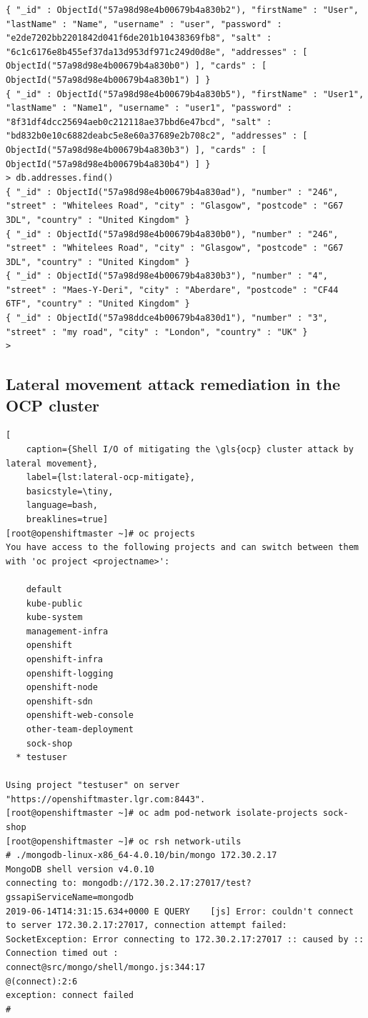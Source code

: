 \begin{lstlisting}
{ "_id" : ObjectId("57a98d98e4b00679b4a830b2"), "firstName" : "User", "lastName" : "Name", "username" : "user", "password" : "e2de7202bb2201842d041f6de201b10438369fb8", "salt" : "6c1c6176e8b455ef37da13d953df971c249d0d8e", "addresses" : [ ObjectId("57a98d98e4b00679b4a830b0") ], "cards" : [ ObjectId("57a98d98e4b00679b4a830b1") ] }
{ "_id" : ObjectId("57a98d98e4b00679b4a830b5"), "firstName" : "User1", "lastName" : "Name1", "username" : "user1", "password" : "8f31df4dcc25694aeb0c212118ae37bbd6e47bcd", "salt" : "bd832b0e10c6882deabc5e8e60a37689e2b708c2", "addresses" : [ ObjectId("57a98d98e4b00679b4a830b3") ], "cards" : [ ObjectId("57a98d98e4b00679b4a830b4") ] }
> db.addresses.find()
{ "_id" : ObjectId("57a98d98e4b00679b4a830ad"), "number" : "246", "street" : "Whitelees Road", "city" : "Glasgow", "postcode" : "G67 3DL", "country" : "United Kingdom" }
{ "_id" : ObjectId("57a98d98e4b00679b4a830b0"), "number" : "246", "street" : "Whitelees Road", "city" : "Glasgow", "postcode" : "G67 3DL", "country" : "United Kingdom" }
{ "_id" : ObjectId("57a98d98e4b00679b4a830b3"), "number" : "4", "street" : "Maes-Y-Deri", "city" : "Aberdare", "postcode" : "CF44 6TF", "country" : "United Kingdom" }
{ "_id" : ObjectId("57a98ddce4b00679b4a830d1"), "number" : "3", "street" : "my road", "city" : "London", "country" : "UK" }
>
\end{lstlisting}

\subsection{Lateral movement attack remediation in the OCP cluster}
\begin{lstlisting}[
	caption={Shell I/O of mitigating the \gls{ocp} cluster attack by lateral movement},
	label={lst:lateral-ocp-mitigate},
	basicstyle=\tiny,
	language=bash,
	breaklines=true]
[root@openshiftmaster ~]# oc projects
You have access to the following projects and can switch between them with 'oc project <projectname>':

    default
    kube-public
    kube-system
    management-infra
    openshift
    openshift-infra
    openshift-logging
    openshift-node
    openshift-sdn
    openshift-web-console
    other-team-deployment
    sock-shop
  * testuser

Using project "testuser" on server "https://openshiftmaster.lgr.com:8443".
[root@openshiftmaster ~]# oc adm pod-network isolate-projects sock-shop
[root@openshiftmaster ~]# oc rsh network-utils
# ./mongodb-linux-x86_64-4.0.10/bin/mongo 172.30.2.17
MongoDB shell version v4.0.10
connecting to: mongodb://172.30.2.17:27017/test?gssapiServiceName=mongodb
2019-06-14T14:31:15.634+0000 E QUERY    [js] Error: couldn't connect to server 172.30.2.17:27017, connection attempt failed: SocketException: Error connecting to 172.30.2.17:27017 :: caused by :: Connection timed out :
connect@src/mongo/shell/mongo.js:344:17
@(connect):2:6
exception: connect failed
#
\end{lstlisting}

